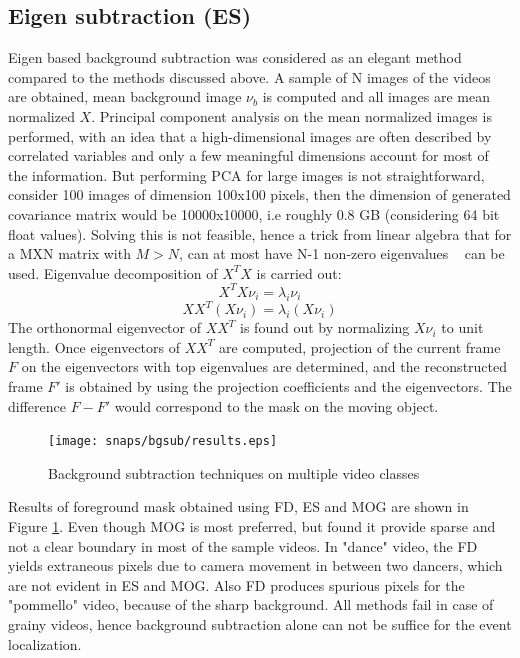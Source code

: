 \subsection{Eigen subtraction (ES)}
Eigen based background subtraction was considered as an elegant method compared to the methods discussed above.  A sample of N images of the videos are obtained, mean background image $\nu_b$ is computed and all images are mean normalized  $X$.  Principal component analysis on the mean normalized images is performed, with an idea that a high-dimensional images are often described by correlated variables and only a few meaningful dimensions account for most of the information.  But performing PCA for large images is not straightforward, consider 100 images of dimension 100x100 pixels, then the dimension of generated covariance matrix would be 10000x10000, i.e roughly 0.8 GB (considering 64 bit float values). Solving this is not feasible, hence a trick from linear algebra that for a MXN matrix with $M>N$, can at most have N-1 non-zero eigenvalues ~\cite{Duda01} can be used. Eigenvalue decomposition of $X^TX$ is carried out:
$$X^TX\nu_i=\lambda_i\nu_i$$
$$XX^T(X\nu_i)=\lambda_i(X\nu_i)$$
The orthonormal eigenvector of $XX^T$ is found out by normalizing $X\nu_i$ to unit length.  Once eigenvectors of $XX^T$  are computed, projection of the current frame $F$ on the eigenvectors with top eigenvalues are determined, and the reconstructed frame $F'$ is obtained by using the projection coefficients and the eigenvectors.  The difference $F-F'$ would correspond to the mask on the moving object.

\begin{figure}[htpb]
   \begin{center}
	    \texttt{[image: snaps/bgsub/results.eps]}     
     \caption {Background subtraction techniques on multiple video classes}
   \label{fig:bgsub}
   \end{center}
 \end{figure}
\par Results of foreground mask obtained using FD, ES and MOG are shown in Figure \ref{fig:bgsub}. Even though MOG is most preferred, but found it provide sparse and not a clear boundary in most of the sample videos.  In "dance" video, the FD yields extraneous pixels due to camera movement in between two dancers, which are not evident in ES and MOG.  Also FD produces spurious pixels for the "pommello" video, because of the sharp background.  All methods fail in case of grainy videos, hence background subtraction alone can not be suffice for the event localization.

